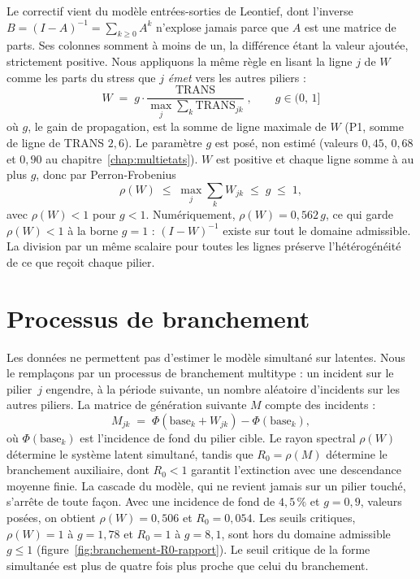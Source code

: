 Le correctif vient du modèle entrées-sorties de Leontief, dont l'inverse
$B=(I-A)^{-1}=\sum_{k\ge0}A^k$ n'explose jamais parce que $A$ est une matrice de parts. Ses
colonnes somment à moins de un, la différence étant la valeur ajoutée, strictement positive.
Nous appliquons la même règle en lisant la ligne $j$ de $W$ comme les parts du stress que $j$
\emph{émet} vers les autres piliers :
\begin{equation}
\label{eq:norm}
\boxed{\;W \;=\; g \cdot \frac{\mathrm{TRANS}}{\max_j \sum_k \mathrm{TRANS}_{jk}}\;,
\qquad g \in (0,\,1]\;}
\end{equation}
où $g$, le gain de propagation, est la somme de ligne maximale de $W$ (P1, somme de ligne de TRANS $2{,}6$).
Le paramètre $g$ est posé, non estimé (valeurs $0{,}45$, $0{,}68$ et $0{,}90$ au
chapitre~\ref{chap:multietats}). $W$ est positive et chaque ligne somme à
au plus $g$, donc par Perron-Frobenius
\begin{equation}
\rho(W)\;\le\;\max_j\sum_k W_{jk}\;\le\;g\;\le\;1,
\end{equation}
avec $\rho(W)<1$ pour $g<1$. Numériquement, $\rho(W)=0{,}562\,g$, ce qui garde $\rho(W)<1$ à la borne
$g=1$ : $(I-W)^{-1}$ existe sur tout le domaine admissible. La
division par un même scalaire pour toutes les lignes préserve l'hétérogénéité de ce que reçoit
chaque pilier.


\section{Processus de branchement}
\label{sec:branch}

Les données ne permettent pas d'estimer le modèle simultané sur latentes. Nous le remplaçons par un
processus de branchement multitype : un incident sur le pilier~$j$ engendre, à la période suivante,
un nombre aléatoire d'incidents sur les autres piliers. La matrice de génération suivante $M$ compte des incidents :
\begin{equation}
M_{jk}\;=\;\Phi(\text{base}_k+W_{jk})-\Phi(\text{base}_k),
\end{equation}
où $\Phi(\text{base}_k)$ est l'incidence de fond du pilier cible.
Le rayon spectral $\rho(W)$ détermine le système latent simultané, tandis que $R_0=\rho(M)$ détermine
le branchement auxiliaire, dont $R_0<1$ garantit l'extinction avec une descendance moyenne finie. La cascade du modèle, qui ne revient jamais sur un pilier touché, s'arrête de toute façon. Avec une incidence de fond de
$4{,}5\,\%$ et $g=0{,}9$, valeurs posées, on obtient $\rho(W)=0{,}506$ et $R_0=0{,}054$. Les seuils critiques,
$\rho(W)=1$ à $g=1{,}78$ et $R_0=1$ à $g=8{,}1$, sont hors du domaine admissible $g\le1$
(figure~\ref{fig:branchement-R0-rapport}). Le seuil critique de la forme simultanée est plus de quatre fois plus proche que celui du branchement.

